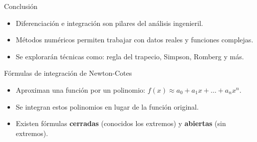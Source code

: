 \documentclass[main.tex]{subfiles}
\begin{document}
\begin{frame}{Conclusión}
  \begin{itemize}
    \item Diferenciación e integración son pilares del análisis ingenieril.
    \item Métodos numéricos permiten trabajar con datos reales y funciones complejas.
    \item Se explorarán técnicas como: regla del trapecio, Simpson, Romberg y más.
  \end{itemize}
\end{frame}
\begin{frame}{Fórmulas de integración de Newton-Cotes}
  \begin{itemize}
    \item Aproximan una función por un polinomio: \( f(x) \approx a_0 + a_1x + \ldots + a_nx^n \).
    \item Se integran estos polinomios en lugar de la función original.
    \item Existen fórmulas \textbf{cerradas} (conocidos los extremos) y \textbf{abiertas} (sin extremos).
  \end{itemize}
\end{frame}
\end{document}
